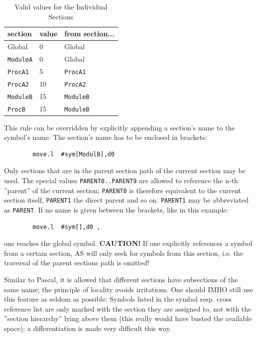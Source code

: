 \documentclass[12pt,twoside]{report}
\newcommand{\bb}[1]{{\bf #1}}
\newcommand{\tty}[1]{{\tt #1}}
\newcommand{\asname}{{AS}}
\begin{document}
\begin{table}[htb]
\begin{center}\begin{tabular}{|l|l|l|}
\hline
section        &   value &   from section... \\
\hline
\hline
Global         &     0   &   Global \\
\hline
\tty{ModuleA}  &     0   &   Global \\
\hline
\tty{ProcA1}   &     5   &   \tty{ProcA1} \\
\hline
\tty{ProcA2}   &    10   &   \tty{ProcA2} \\
\hline
\tty{ModuleB}  &    15   &   \tty{ModuleB} \\
\hline
\tty{ProcB}    &    15   &   \tty{ModuleB} \\
\hline
\end{tabular}\end{center}
\caption{Valid values for the Individual Sections\label{TabSymErg}}
\end{table}
This rule can be overridden by explicitly appending a section's name
to the symbol's name.  The section's name has to be enclosed in
brackets:
\begin{verbatim}
        move.l  #sym[ModulB],d0
\end{verbatim}
Only sections that are in the parent section path of the current
section may be used.  The special values \tty{PARENT0..PARENT9} are allowed
to reference the n-th ''parent'' of the current section; \tty{PARENT0} is
therefore equivalent to the current section itself, \tty{PARENT1} the
direct parent and so on.  \tty{PARENT1} may be abbreviated as \tty{PARENT}.  If
no name is given between the brackets, like in this example:
\begin{verbatim}
        move.l  #sym[],d0 ,
\end{verbatim}
one reaches the global symbol.  \bb{CAUTION!}  If one explicitly
references a symbol from a certain section, \asname{} will only seek for
symbols from this section, i.e. the traversal of the parent sections
path is omitted!

Similar to Pascal, it is allowed that different sections have
subsections of the same name; the principle of locality avoids
irritations.  One should IMHO still use this feature as seldom as
possible: Symbols listed in the symbol resp. cross reference list are
only marked with the section they are assigned to, not with the
''section hierarchy'' lying above them (this really would have busted
the available space); a differentiation is made very difficult this
way.
\end{document}
